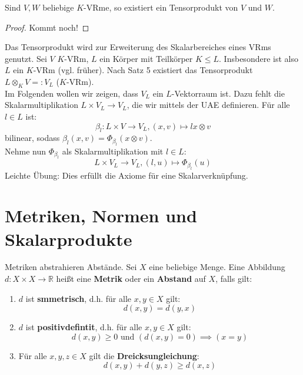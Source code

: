 \documentclass[parskip,a4paper,twoside,DIV15,BCOR12mm]{scrbook}
\begin{document}
\begin{theo}
Sind $V,W$ beliebige $K$-VRme, so existiert ein Tensorprodukt von $V$ und $W$.
\end{theo}

\begin{proof}
Kommt noch!
\end{proof}

\begin{application}
Das Tensorprodukt wird zur Erweiterung des Skalarbereiches eines VRms genutzt.
Sei $V$ $K$-VRm, $L$ ein Körper mit Teilkörper $K\le L$. Insbesondere ist also
$L$ ein $K$-VRm (vgl. früher). Nach Satz 5 existiert das Tensorprodukt 
$L\otimes_K V=:V_L$ ($K$-VRm).\\
Im Folgenden wollen wir zeigen, dass $V_L$ ein $L$-Vektorraum ist. Dazu fehlt
die Skalarmultiplikation $L\times V_L\to V_L$, die wir mittels der UAE definieren.
Für alle $l\in L$ ist:
\[\beta_l:L\times V\to V_L,(x,v)\mapsto lx\otimes v\]
bilinear, sodass $\beta_l(x,v)=\Phi_{\beta_l}(x\otimes v)$.\\
Nehme nun $\Phi_{\beta_l}$ als Skalarmultiplikation mit $l\in L$:
\[L\times V_L\to V_L,(l,u)\mapsto \Phi_{\beta_l}(u)\]
Leichte Übung: Dies erfüllt die Axiome für eine Skalarverknüpfung.
\end{application}

\begin{comment}
$V_L$ enthält $V$ als $K$-Untervektorraum über die Einbettung:
\[V\to V_L,v\mapsto 1\otimes v\]
Für eine Basis $B$ von $V$ ist das Bild $\{1\otimes b\mid b\in B\}\subseteq V_L$
eine Basis des $L$-VRms $V_L$. Insbesondere ist
\[L\otimes_K K^n\stackrel{\sim}{=}L^n\]
eine Isomorphie von $L$-VRmen.
\end{comment}

\chapter{Metriken, Normen und Skalarprodukte}
\begin{definition}
Metriken abstrahieren Abstände. Sei $X$ eine beliebige Menge. Eine Abbildung
$d:X\times X\to \mathbb{R}$ heißt eine \textbf{Metrik} oder ein \textbf{Abstand}
auf $X$, falls gilt:
\begin{enumerate}
\item $d$ ist \textbf{smmetrisch}, d.h. für alle $x,y\in X$ gilt:
\[d(x,y)=d(y,x)\]
\item $d$ ist \textbf{positivdefintit}, d.h. für alle $x,y\in X$ gilt:
\[d(x,y)\ge 0 \text{ und } (d(x,y)=0)\implies (x=y)\]
\item Für alle $x,y,z\in X$ gilt die \textbf{Dreicksungleichung}:
\[d(x,y)+d(y,z)\ge d(x,z)\]
\end{enumerate}
\end{definition}
\end{document}
